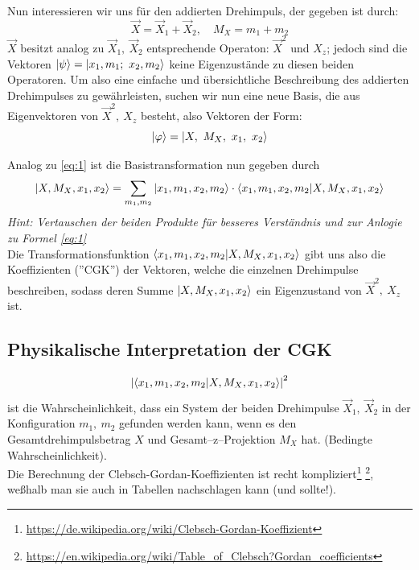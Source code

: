 \documentclass[Ex4_Zusammenfassung.tex]{subfiles}
\begin{document}
Nun interessieren wir uns für den addierten Drehimpuls, der gegeben ist durch:
\begin{equation}
	\vec{X} = \vec{X}_1 + \vec{X}_2, \quad M_X = m_1 + m_2
\end{equation}
$\vec{X}$ besitzt analog zu $\vec{X}_1,\ \vec{X}_2$ entsprechende Operaton: $\vec{X}^2$ und $X_z$; jedoch sind die Vektoren $\ket{\psi} = \ket{x_1, m_1;\ x_2, m_2}$ keine Eigenzustände zu diesen beiden Operatoren. Um also eine einfache und übersichtliche Beschreibung des addierten Drehimpulses zu gewährleisten, suchen wir nun eine neue Basis, die aus Eigenvektoren von $\vec{X}^2,\ X_z$ besteht, also Vektoren der Form:
\begin{equation}
	\ket{\varphi} = \ket{X,\ M_X,\ x_1,\ x_2}
\end{equation}

Analog zu \ref{eq:1} ist die Basistransformation nun gegeben durch
\begin{equation}
	\ket{X, M_X, x_1, x_2} =\sum_{m_1,m_2} \ket{x_1, m_1, x_2, m_2} \cdot \braket{x_1, m_1, x_2,m_2|X, M_X, x_1, x_2}
\end{equation}
\textit{Hint: Vertauschen der beiden Produkte für besseres Verständnis und zur Anlogie zu Formel \ref{eq:1}}\\

Die Transformationsfunktion $\braket{x_1, m_1, x_2,m_2|X, M_X, x_1, x_2}$ gibt uns also die Koeffizienten (''CGK'') der Vektoren, welche die einzelnen Drehimpulse beschreiben, sodass deren Summe $\ket{X, M_X, x_1, x_2}$ ein Eigenzustand von $\vec{X}^2,\ X_z$ ist. 

\subsection*{Physikalische Interpretation der CGK}
\begin{equation}
	\left\vert \braket{x_1, m_1, x_2,m_2|X, M_X, x_1, x_2} \right\vert^2
\end{equation}
ist die Wahrscheinlichkeit, dass ein System der beiden Drehimpulse $\vec{X}_1,\ \vec{X}_2$ in der Konfiguration $m_1,\ m_2$ gefunden werden kann, wenn es den Gesamtdrehimpulsbetrag $X$ und Gesamt--z--Projektion $M_X$ hat. (Bedingte Wahrscheinlichkeit).\\

Die Berechnung der Clebsch-Gordan-Koeffizienten ist recht kompliziert\footnote{\href{https://de.wikipedia.org/wiki/Clebsch-Gordan-Koeffizient}{https://de.wikipedia.org/wiki/Clebsch-Gordan-Koeffizient}} \footnote{\href{https://en.wikipedia.org/wiki/Table_of_Clebsch?Gordan_coefficients}{https://en.wikipedia.org/wiki/Table\_of\_Clebsch?Gordan\_coefficients}}, weßhalb man sie auch in Tabellen nachschlagen kann (und sollte!).
\end{document}

